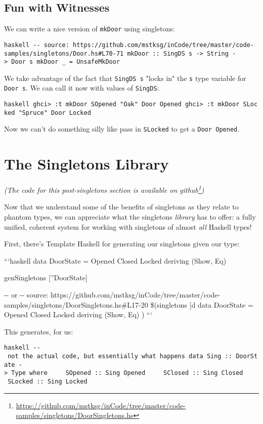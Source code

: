 \documentclass[]{article}
\renewcommand{\href}[2]{#2\footnote{\url{#1}}}
\begin{document}
\subsection{Fun with Witnesses}

We can write a nice version of \texttt{mkDoor} using singletons:

\texttt{haskell\ -\/-\ source:\ https://github.com/mstksg/inCode/tree/master/code-samples/singletons/Door.hs\#L70-71\ mkDoor\ ::\ SingDS\ s\ -\textgreater{}\ String\ -\textgreater{}\ Door\ s\ mkDoor\ \_\ =\ UnsafeMkDoor}

We take advantage of the fact that \texttt{SingDS\ s} "locks in" the \texttt{s}
type variable for \texttt{Door\ s}. We can call it now with values of
\texttt{SingDS}:

\texttt{haskell\ ghci\textgreater{}\ :t\ mkDoor\ SOpened\ "Oak"\ Door\ \textquotesingle{}Opened\ ghci\textgreater{}\ :t\ mkDoor\ SLocked\ "Spruce"\ Door\ \textquotesingle{}Locked}

Now we can't do something silly like pass in \texttt{SLocked} to get a
\texttt{Door\ \textquotesingle{}Opened}.

\section{The Singletons Library}

\emph{(The code for this post-singletons section is available
\href{https://github.com/mstksg/inCode/tree/master/code-samples/singletons/DoorSingletons.hs}{on
github})}

Now that we understand some of the benefits of singletons as they relate to
phantom types, we can appreciate what the singletons \emph{library} has to
offer: a fully unified, coherent system for working with singletons of almost
\emph{all} Haskell types!

First, there's Template Haskell for generating our singletons given our type:

```haskell data DoorState = Opened \textbar{} Closed \textbar{} Locked deriving
(Show, Eq)

genSingletons {[}''DoorState{]}

-\/- or -\/- source:
https://github.com/mstksg/inCode/tree/master/code-samples/singletons/DoorSingletons.hs\#L17-20
\$(singletons {[}d\textbar{} data DoorState = Opened \textbar{} Closed
\textbar{} Locked deriving (Show, Eq) \textbar{}{]}) ```

This generates, for us:

\texttt{haskell\ -\/-\ not\ the\ actual\ code,\ but\ essentially\ what\ happens\ data\ Sing\ ::\ DoorState\ -\textgreater{}\ Type\ where\ \ \ \ \ SOpened\ ::\ Sing\ \textquotesingle{}Opened\ \ \ \ \ SClosed\ ::\ Sing\ \textquotesingle{}Closed\ \ \ \ \ SLocked\ ::\ Sing\ \textquotesingle{}Locked}
\end{document}
